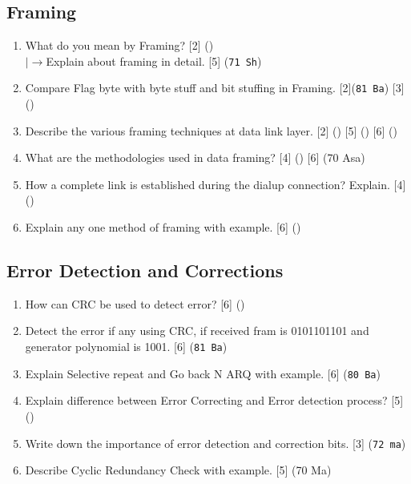 \documentclass[12pt]{article}
\newcommand{\lb}{\\$\left|\rightarrow\right.$}
\begin{document}
	\subsection{Framing}
		\begin{enumerate}[noitemsep, topsep=0pt]
			\item What do you mean by Framing? \hfill [2] () 
			\lb Explain about framing in detail. \hfill [5] (\texttt{71 Sh})

			\item Compare Flag byte with byte stuff and bit stuffing in Framing. \hfill [2](\texttt{81 Ba}) [3] () 

			\item Describe the various framing techniques at data link layer. \hfill [2] () [5] () [6] ()

			\item What are the methodologies used in data framing? \hfill [4] () [6] (70 Asa)

			\item How a complete link is established during the dialup connection? Explain. \hfill[4] ()

			\item Explain any one method of framing with example. \hfill [6] ()
		\end{enumerate}

	\subsection{Error Detection and Corrections}
		\begin{enumerate}[noitemsep, topsep=0pt]
			\item How can CRC be used to detect error? \hfill [6] ()
			
			\item Detect the error if any using CRC, if received fram is 0101101101 and generator polynomial is 1001. \hfill [6] (\texttt{81 Ba})

			\item Explain Selective repeat and Go back N ARQ with example. \hfill [6] (\texttt{80 Ba})

			\item Explain difference between Error Correcting and Error detection process? \hfill [5] ()

			\item Write down the importance of error detection and correction bits. \hfill [3] (\texttt{72 ma})

			\item Describe Cyclic Redundancy Check with example. \hfill [5] (70 Ma)
		\end{enumerate}
\end{document}
